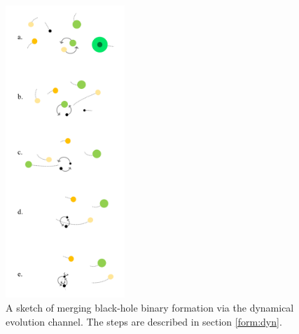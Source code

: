 \documentclass[review]{elsarticle}
\begin{document}
\begin{figure}
	\centering
	\includegraphics[width=0.4\textwidth]{channel3.png}
	\caption{\label{fig:dynamical} A sketch of merging black-hole binary formation via the dynamical evolution channel.  The steps are described in section \ref{form:dyn}.}
\end{figure}
\end{document}
